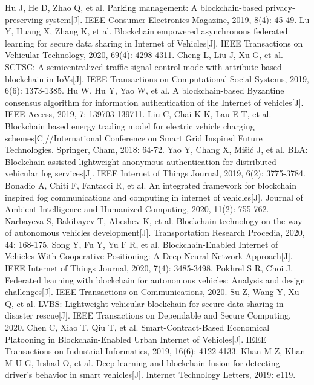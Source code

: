 \begin{thebibliography}{99}
 Hu J, He D, Zhao Q, et al. Parking management: A blockchain-based privacy-preserving system[J]. IEEE Consumer Electronics Magazine, 2019, 8(4): 45-49.
 Lu Y, Huang X, Zhang K, et al. Blockchain empowered asynchronous federated learning for secure data sharing in Internet of Vehicles[J]. IEEE Transactions on Vehicular Technology, 2020, 69(4): 4298-4311.
 Cheng L, Liu J, Xu G, et al. SCTSC: A semicentralized traffic signal control mode with attribute-based blockchain in IoVs[J]. IEEE Transactions on Computational Social Systems, 2019, 6(6): 1373-1385.
 Hu W, Hu Y, Yao W, et al. A blockchain-based Byzantine consensus algorithm for information authentication of the Internet of vehicles[J]. IEEE Access, 2019, 7: 139703-139711.
 Liu C, Chai K K, Lau E T, et al. Blockchain based energy trading model for electric vehicle charging schemes[C]//International Conference on Smart Grid Inspired Future Technologies. Springer, Cham, 2018: 64-72.
 Yao Y, Chang X, Mišić J, et al. BLA: Blockchain-assisted lightweight anonymous authentication for distributed vehicular fog services[J]. IEEE Internet of Things Journal, 2019, 6(2): 3775-3784.
 Bonadio A, Chiti F, Fantacci R, et al. An integrated framework for blockchain inspired fog communications and computing in internet of vehicles[J]. Journal of Ambient Intelligence and Humanized Computing, 2020, 11(2): 755-762.
 Narbayeva S, Bakibayev T, Abeshev K, et al. Blockchain technology on the way of autonomous vehicles development[J]. Transportation Research Procedia, 2020, 44: 168-175.
 Song Y, Fu Y, Yu F R, et al. Blockchain-Enabled Internet of Vehicles With Cooperative Positioning: A Deep Neural Network Approach[J]. IEEE Internet of Things Journal, 2020, 7(4): 3485-3498.
 Pokhrel S R, Choi J. Federated learning with blockchain for autonomous vehicles: Analysis and design challenges[J]. IEEE Transactions on Communications, 2020.
 Su Z, Wang Y, Xu Q, et al. LVBS: Lightweight vehicular blockchain for secure data sharing in disaster rescue[J]. IEEE Transactions on Dependable and Secure Computing, 2020.
 Chen C, Xiao T, Qiu T, et al. Smart-Contract-Based Economical Platooning in Blockchain-Enabled Urban Internet of Vehicles[J]. IEEE Transactions on Industrial Informatics, 2019, 16(6): 4122-4133.
 Khan M Z, Khan M U G, Irshad O, et al. Deep learning and blockchain fusion for detecting driver's behavior in smart vehicles[J]. Internet Technology Letters, 2019: e119.

\end{thebibliography}
